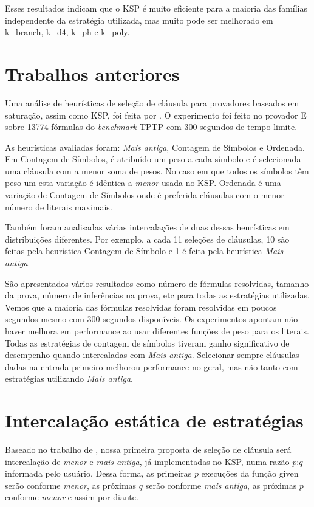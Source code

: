 Esses resultados indicam que o KSP é muito eficiente para a maioria das famílias independente da estratégia utilizada, mas muito pode ser melhorado em k\_branch, k\_d4, k\_ph e k\_poly.

\section{Trabalhos anteriores}
Uma análise de heurísticas de seleção de cláusula para provadores baseados em saturação, assim como KSP, foi feita por \cite{stephan}. O experimento foi feito no provador E sobre 13774 fórmulas do \textit{benchmark} TPTP \cite{TPTP} com 300 segundos de tempo limite.

As heurísticas avaliadas foram: \textit{Mais antiga}, Contagem de Símbolos e Ordenada. Em Contagem de Símbolos, é atribuído um peso a cada símbolo e é selecionada uma cláusula com a menor soma de pesos. No caso em que todos os símbolos têm peso um esta variação é idêntica a \textit{menor} usada no KSP. Ordenada é uma variação de Contagem de Símbolos onde é preferida cláusulas com o menor número de literais maximais.

Também foram analisadas várias intercalações de duas dessas heurísticas em distribuições diferentes. Por exemplo, a cada 11 seleções de cláusulas, 10 são feitas pela heurística Contagem de Símbolo e 1 é feita pela heurística \textit{Mais antiga}.

São apresentados vários resultados como número de fórmulas resolvidas, tamanho da prova, número de inferências na prova, etc para todas as estratégias utilizadas. Vemos que a maioria das fórmulas resolvidas foram resolvidas em poucos segundos mesmo com 300 segundos disponíveis. Os experimentos apontam não haver melhora em performance ao usar diferentes funções de peso para os literais. Todas as estratégias de contagem de símbolos tiveram ganho significativo de desempenho quando intercaladas com \textit{Mais antiga}. Selecionar sempre cláusulas dadas na entrada primeiro melhorou performance no geral, mas não tanto com estratégias utilizando \textit{Mais antiga}.

\section{Intercalação estática de estratégias} \label{secao:1proposta}
Baseado no trabalho de \cite{stephan}, nossa primeira proposta de seleção de cláusula será intercalação de \textit{menor} e \textit{mais antiga}, já implementadas no KSP, numa razão $p$:$q$ informada pelo usuário. Dessa forma, as primeiras $p$ execuções da função {\sf given} serão conforme \textit{menor}, as próximas $q$ serão conforme \textit{mais antiga}, as próximas $p$ conforme \textit{menor} e assim por diante.

